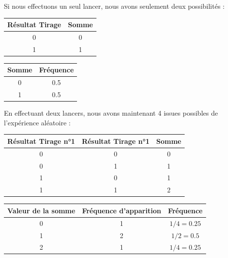 Si nous effectuons un seul lancer, nous avons seulement deux possibilités : 

\begin{center}
    \begin{minipage}{0.45\textwidth}
        \centering
        \begin{tabular}{c|c}
            \textbf{Résultat Tirage} & \textbf{Somme} \\
            \hline 
            0 & 0 \\ 
            1 & 1 \\ 
        \end{tabular}
    \end{minipage}
    \hfill
    \begin{minipage}{0.45\textwidth}
        \centering
        \begin{tabular}{c|c}
            \textbf{Somme} & \textbf{Fréquence} \\
            \hline 
            0 & 0.5 \\ 
            1 & 0.5 \\ 
        \end{tabular}
    \end{minipage}
\end{center}

En effectuant deux lancers, nous avons maintenant 4 issues possibles de l'expérience aléatoire : 

\begin{center}
    \begin{tabular}{c|c|c}
        \textbf{Résultat Tirage n°1} & \textbf{Résultat Tirage n°1} & \textbf{Somme} \\
        \hline 
        0 & 0 & 0 \\
        0 & 1 & 1 \\  
        1 & 0 & 1 \\
        1 & 1 & 2 \\ 
    \end{tabular}
\end{center}

\begin{center}
    \begin{tabular}{c|c|c}
        \textbf{Valeur de la somme} & \textbf{Fréquence d'apparition} & \textbf{Fréquence} \\
        \hline 
        0 & 1 & $1/4 = 0.25$ \\ 
        1 & 2 & $1/2 = 0.5$ \\ 
        2 & 1 & $1/4 = 0.25$ \\ 
    \end{tabular}
\end{center}

